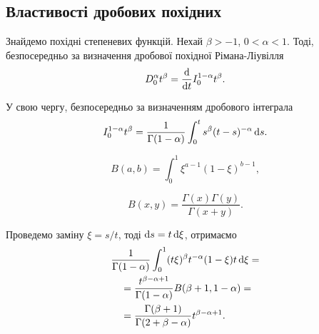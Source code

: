 
\subsection{Властивості дробових похідних}

Знайдемо похідні степеневих функцій. Нехай $\beta > -1$, $0 < \alpha < 1$. Тоді, безпосередньо за визначення дробової похідної Рімана-Ліувілля
\begin{equation}
    D_0^{\alpha} t^\beta = \frac{\mathop{}\!\mathrm{d}}{\mathop{}\!\mathrm{d} t} I_0^{1-\alpha} t^\beta.
\end{equation}

У свою чергу, безпосередньо за визначенням дробового інтеграла
\begin{equation}
    I_0^{1-\alpha} t^\beta = \frac{1}{\Gamma(1 - \alpha)} \int_0^t s^\beta (t- s)^{-\alpha} \mathop{}\!\mathrm{d} s.
\end{equation}

\begin{reminder}
    \nothing
    \begin{definition}
        \begin{equation}
            B(a, b) = \int_0^1 \xi^{a-1}(1-\xi)^{b-1},
        \end{equation}
    \end{definition}
    
    \begin{property}
        \begin{equation}
            B(x, y) = \frac {\Gamma (x) \Gamma (y)}{\Gamma (x + y)}.
        \end{equation}
    \end{property}
\end{reminder}

Проведемо заміну $\xi = s / t$, тоді $\mathop{}\!\mathrm{d} s = t \mathop{}\!\mathrm{d} \xi$, отримаємо
\begin{equation}
    \begin{aligned}
        & \frac{1}{\Gamma(1-\alpha)} \int_0^1 (t \xi)^\beta t^{-\alpha} (1 - \xi) t \mathop{}\!\mathrm{d} \xi = \\
        &\quad = \frac{t^{\beta - \alpha + 1}}{\Gamma(1 - \alpha)} B(\beta + 1, 1 - \alpha) = \\
        &\quad = \frac{\Gamma(\beta + 1)}{\Gamma(2 + \beta - \alpha)} t^{\beta - \alpha + 1}.
    \end{aligned}
\end{equation}


